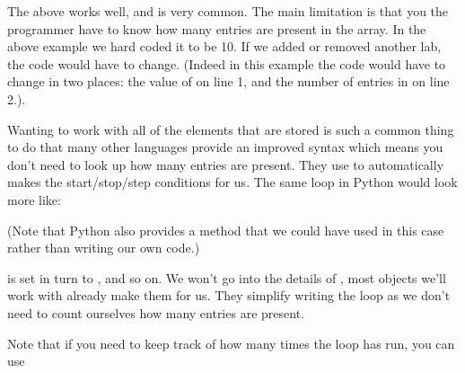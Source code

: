 \documentclass[letterpaper,10pt,british]{sphinxmanual}
\begin{document}
\sphinxAtStartPar
The above works well, and is very common. The main limitation is that you the programmer have to know how many entries are present in the array. In the above example we hard coded it to be 10. If we added or removed another lab, the code would have to change. (Indeed in this example the code would have to change in two places: the value of  on line 1, and the number of entries in  on line 2.).

\sphinxAtStartPar
Wanting to work with all of the elements that are stored is such a common thing to do that many other languages provide an improved syntax which means you don’t need to look up how many entries are present. They use  to automatically makes the start/stop/step conditions for us. The same loop in Python would look more like:

\begin{sphinxVerbatim}[commandchars=\\\{\}]
  \PYG{p}{[}         \PYG{p}{]}
  
   
        
\end{sphinxVerbatim}

\sphinxAtStartPar
(Note that Python also provides a  method that we could have used in this case rather than writing our own code.)

\sphinxAtStartPar
{} is set in turn to ,  and so on. We won’t go into the details of , most objects we’ll work with already make them for us. They simplify writing the loop as we don’t need to count ourselves how many entries are present.

\sphinxAtStartPar
Note that if you need to keep track of how many times the loop has run, you can use
\end{document}
